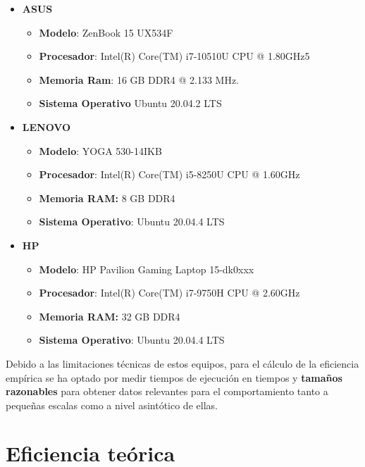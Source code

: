 \documentclass{homework}
\begin{document}
    \begin{itemize}
        \item \textbf{ASUS} 
        \begin{itemize}
            \item \textbf{Modelo}: ZenBook 15 UX534F
            \item \textbf{Procesador}: Intel(R) Core(TM) i7-10510U CPU @ 1.80GHz5
            \item \textbf{Memoria Ram}: 16 GB DDR4 @ 2.133 MHz.
            \item \textbf{Sistema Operativo} Ubuntu 20.04.2 LTS
        \end{itemize}
        
        \item \textbf{LENOVO}
        \begin{itemize}
            \item \textbf{Modelo}: YOGA 530-14IKB
            \item \textbf{Procesador}: Intel(R) Core(TM) i5-8250U CPU @ 1.60GHz
            \item \textbf{Memoria RAM:} 8 GB DDR4
            \item \textbf{Sistema Operativo}: Ubuntu 20.04.4 LTS
        \end{itemize}
        
        \item \textbf{HP}
        \begin{itemize}
            \item \textbf{Modelo}: HP Pavilion Gaming Laptop 15-dk0xxx
            \item \textbf{Procesador}: Intel(R) Core(TM) i7-9750H CPU @ 2.60GHz
            \item \textbf{Memoria RAM:} 32 GB DDR4
            \item \textbf{Sistema Operativo}: Ubuntu 20.04.4 LTS
        \end{itemize}
    \end{itemize}
    
    Debido a las limitaciones técnicas de estos equipos, para el cálculo de la eficiencia empírica se ha 
    optado por medir tiempos de ejecución en tiempos y \textbf{tamaños razonables} para obtener datos relevantes
    para el comportamiento tanto a pequeñas escalas como a nivel asintótico de ellas. 

    \section{Eficiencia teórica}
\end{document}
